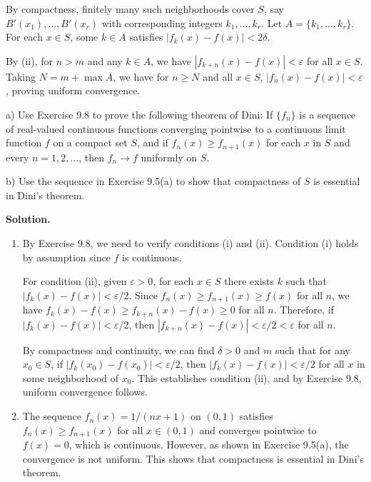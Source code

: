 By compactness, finitely many such neighborhoods cover \( S \), say \( B'(x_1), \ldots, B'(x_r) \) with corresponding integers \( k_1, \ldots, k_r \). Let \( A = \{k_1, \ldots, k_r\} \). For each \( x \in S \), some \( k \in A \) satisfies \( |f_k(x) - f(x)| < 2\delta \).

By (ii), for \( n > m \) and any \( k \in A \), we have \( |f_{k+n}(x) - f(x)| < \varepsilon \) for all \( x \in S \). Taking \( N = m + \max A \), we have for \( n \geq N \) and all \( x \in S \), \( |f_n(x) - f(x)| < \varepsilon \), proving uniform convergence.

\begin{problembox}
a) Use Exercise 9.8 to prove the following theorem of Dini: If \( \{f_n\} \) is a sequence of real-valued continuous functions converging pointwise to a continuous limit function \( f \) on a compact set \( S \), and if \( f_n(x) \geq f_{n+1}(x) \) for each \( x \) in \( S \) and every \( n = 1, 2, \ldots \), then \( f_n \to f \) uniformly on \( S \).

b) Use the sequence in Exercise 9.5(a) to show that compactness of \( S \) is essential in Dini's theorem.
\end{problembox}

\noindent\textbf{Solution.}
\begin{enumerate}[label=(\alph*)]
\item By Exercise 9.8, we need to verify conditions (i) and (ii). Condition (i) holds by assumption since \( f \) is continuous.

For condition (ii), given \( \varepsilon > 0 \), for each \( x \in S \) there exists \( k \) such that \( |f_k(x) - f(x)| < \varepsilon/2 \). Since \( f_n(x) \geq f_{n+1}(x) \geq f(x) \) for all \( n \), we have \( f_k(x) - f(x) \geq f_{k+n}(x) - f(x) \geq 0 \) for all \( n \). Therefore, if \( |f_k(x) - f(x)| < \varepsilon/2 \), then \( |f_{k+n}(x) - f(x)| < \varepsilon/2 < \varepsilon \) for all \( n \).

By compactness and continuity, we can find \( \delta > 0 \) and \( m \) such that for any \( x_0 \in S \), if \( |f_k(x_0) - f(x_0)| < \varepsilon/2 \), then \( |f_k(x) - f(x)| < \varepsilon/2 \) for all \( x \) in some neighborhood of \( x_0 \). This establishes condition (ii), and by Exercise 9.8, uniform convergence follows.

\item The sequence \( f_n(x) = 1/(nx + 1) \) on \( (0, 1) \) satisfies \( f_n(x) \geq f_{n+1}(x) \) for all \( x \in (0, 1) \) and converges pointwise to \( f(x) = 0 \), which is continuous. However, as shown in Exercise 9.5(a), the convergence is not uniform. This shows that compactness is essential in Dini's theorem.
\end{enumerate}

